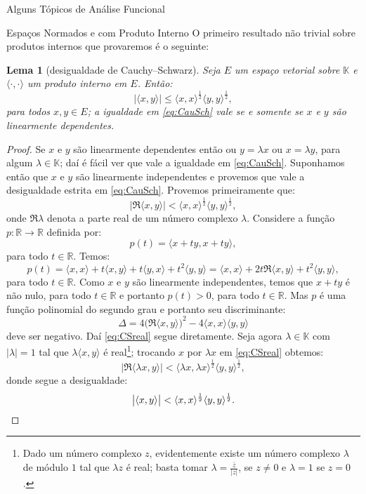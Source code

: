 \documentclass[oneside,final,11pt]{amsbook}
\newcommand{\R}{\mathds R}
\newcommand{\K}{\mathds K}
\theoremstyle{remark}\newtheorem{exercise}{Exercício}[chapter]
\theoremstyle{remark}\newtheorem{*exercise}[exercise]{\hbox to 0pt{\hskip 0pt minus 1fil*}Exercício}
\theoremstyle{definition}\newtheorem{exdefin}{Definição}[chapter]
\theoremstyle{plain}\newtheorem{teo}{Teorema}[section]
\theoremstyle{plain}\newtheorem{lem}[teo]{Lema}
\theoremstyle{plain}\newtheorem{prop}[teo]{Proposição}
\theoremstyle{plain}\newtheorem{cor}[teo]{Corolário}
\theoremstyle{definition}\newtheorem{defin}[teo]{Definição}
\theoremstyle{remark}\newtheorem{rem}[teo]{Observação}
\theoremstyle{definition}\newtheorem{notation}[teo]{Notação}
\theoremstyle{definition}\newtheorem{convention}[teo]{Convenção}
\theoremstyle{definition}\newtheorem{example}[teo]{Exemplo}
\numberwithin{section}{chapter}
\numberwithin{equation}{section}
\begin{document}
\begin{chapter}{Alguns Tópicos de Análise Funcional}
\begin{section}{Espaços Normados e com Produto Interno}
O primeiro resultado não trivial sobre produtos internos que provaremos é o seguinte:
\begin{lem}[desigualdade de Cauchy--Schwarz]
\label{thm:CauchySchwarz}
Seja $E$ um espaço vetorial sobre $\K$ e $\langle\cdot,\cdot\rangle$ um produto interno em $E$. Então:
\begin{equation}\label{eq:CauSch}
\big\vert\langle x,y\rangle\big\vert\le\langle x,x\rangle^{\frac12}\langle y,y\rangle^{\frac12},
\end{equation}
para todos $x,y\in E$; a igualdade em \eqref{eq:CauSch} vale se e somente se $x$ e $y$ são linearmente dependentes.
\end{lem}
\begin{proof}
Se $x$ e $y$ são linearmente dependentes então ou $y=\lambda x$ ou $x=\lambda y$, para algum $\lambda\in\K$;
daí é fácil ver que vale a igualdade em \eqref{eq:CauSch}. Suponhamos então que $x$ e $y$ são linearmente independentes
e provemos que vale a desigualdade estrita em \eqref{eq:CauSch}.
Provemos primeiramente que:
\begin{equation}\label{eq:CSreal}
\big\vert\Re\langle x,y\rangle\big\vert<\langle x,x\rangle^{\frac12}\langle y,y\rangle^{\frac12},
\end{equation}
onde $\Re\lambda$\index[simbolos]{$\Re\lambda$} denota a parte
real
de um número complexo $\lambda$.
Considere a função $p:\R\to\R$ definida por:
\[p(t)=\langle x+ty,x+ty\rangle,\]
para todo $t\in\R$. Temos:
\[p(t)=\langle x,x\rangle+t\langle x,y\rangle+t\langle y,x\rangle+t^2\langle y,y\rangle=
\langle x,x\rangle+2t\Re\langle x,y\rangle+t^2\langle y,y\rangle,\]
para todo $t\in\R$. Como $x$ e $y$ são linearmente independentes, temos que $x+ty$ é não nulo, para todo $t\in\R$
e portanto $p(t)>0$, para todo $t\in\R$. Mas $p$ é uma função polinomial do segundo grau e portanto
seu discriminante:
\[\Delta=4\big(\Re\langle x,y\rangle\big)^2-4\langle x,x\rangle\langle y,y\rangle\]
deve ser negativo. Daí \eqref{eq:CSreal} segue diretamente. Seja agora $\lambda\in\K$ com
$\vert\lambda\vert=1$ tal que $\lambda\langle x,y\rangle$ é real\footnote{%
Dado um número complexo $z$, evidentemente existe um número complexo $\lambda$ de módulo $1$ tal que $\lambda z$
é real; basta tomar $\lambda=\frac{\bar z}{\vert z\vert}$, se $z\ne0$ e $\lambda=1$ se $z=0$.}; trocando $x$ por
$\lambda x$ em \eqref{eq:CSreal} obtemos:
\[\big\vert\Re\langle\lambda x,y\rangle\big\vert<\langle\lambda x,\lambda x\rangle^{\frac12}\langle y,y\rangle^{\frac12},\]
donde segue a desigualdade:
\[\big\vert\langle x,y\rangle\big\vert<\langle x,x\rangle^{\frac12}\langle y,y\rangle^{\frac12}.\qedhere\]
\end{proof}


\end{section}
\end{chapter}
\end{document}
